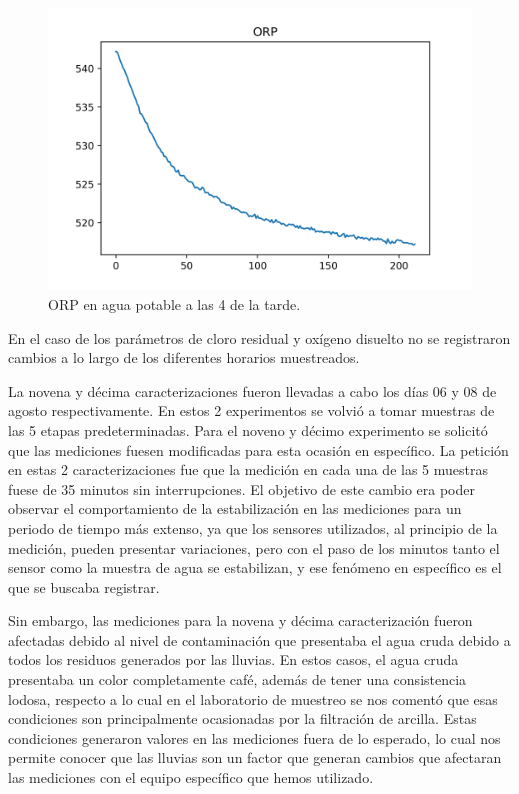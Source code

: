 \begin{figure}[h]
	\centering
	\includegraphics[scale=0.7]{imgss164.png}
	\caption{ORP en agua potable a las 4 de la tarde.}
	\label{fig:figura1000_11}
\end{figure}

En el caso de los parámetros de cloro residual y oxígeno disuelto no se registraron cambios a lo largo de los diferentes horarios muestreados. 

La novena y décima caracterizaciones fueron llevadas a cabo los días 06 y 08 de agosto respectivamente. En estos 2 experimentos se volvió a tomar muestras de las 5 etapas predeterminadas. Para el noveno y décimo experimento se solicitó que las mediciones fuesen modificadas 
para esta ocasión en específico. La petición en estas 2 caracterizaciones fue que la medición en cada una de las 5 muestras fuese de 35 minutos sin interrupciones. El objetivo de este cambio era poder observar el comportamiento de la estabilización en las mediciones para 
un periodo de tiempo más extenso, ya que los sensores utilizados, al principio de la medición, pueden presentar variaciones, pero con el paso de los minutos tanto el sensor como la muestra de agua se estabilizan, y ese fenómeno 
en específico es el que se buscaba registrar.

Sin embargo, las mediciones para la novena y décima caracterización fueron afectadas debido al nivel de contaminación que presentaba el agua cruda debido a todos los residuos generados por 
las lluvias. En estos casos, el agua cruda presentaba un color completamente café, además de tener una consistencia lodosa, respecto a lo cual en el laboratorio de muestreo se nos comentó que esas condiciones 
son principalmente ocasionadas por la filtración de arcilla. Estas condiciones generaron valores en las mediciones fuera de lo esperado, lo cual nos permite conocer que las lluvias son un factor que generan cambios que 
afectaran las mediciones con el equipo específico que hemos utilizado.

